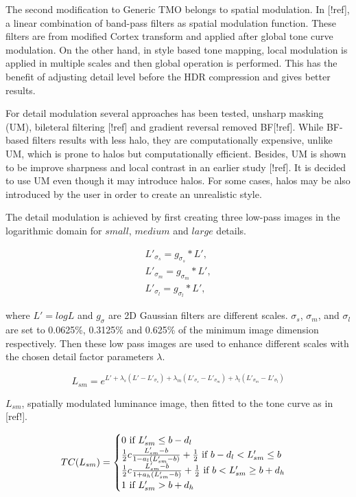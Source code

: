 The second modification to Generic TMO belongs to spatial modulation. In [!ref], a linear combination of band-pass filters as spatial modulation function. These filters are from modified Cortex transform and applied after global tone curve modulation. On the other hand, in style based tone mapping, local modulation is applied in multiple scales and then global operation is performed. This has the benefit of adjusting detail level before the HDR compression and gives better results. 

For detail modulation several approaches has been tested, unsharp masking (UM), bileteral filtering [!ref] and gradient reversal removed BF[!ref]. While BF-based filters results with less halo, they are computationally expensive, unlike UM, which is prone to halos but computationally efficient. Besides, UM is shown to be improve sharpness and local contrast in an earlier study [!ref]. It is decided to use UM even though it may introduce halos. For some cases, halos may be also introduced by the user in order to create an unrealistic style.

The detail modulation is achieved by first creating three low-pass images in the logarithmic domain for $small$, $medium$ and $large$ details.

\begin{align}
L'_{\sigma_s} = g _{\sigma_s} * L', \\
L'_{\sigma_m} = g _{\sigma_m} * L', \\
L'_{\sigma_l} = g _{\sigma_l} * L', 
\end{align}

where $L' = log L$ and $g_\sigma$ are 2D Gaussian filters are different scales. $\sigma_s$, $\sigma_m$, and $\sigma_l$ are set to 0.0625\%, 0.3125\% and 0.625\% of the minimum image dimension respectively. Then these low pass images are used to enhance different scales with the chosen detail factor parameters $\lambda$.

\begin{equation}
    L_{sm} = e^{L' + \lambda_s(L' - L'_{\sigma_s}) + \lambda_m(L'_{\sigma_s} - L'_{\sigma_m}) + \lambda_l(L'_{\sigma_m} - L'_{\sigma_l})}
\end{equation}

$L_{sm}$, spatially modulated luminance image, then fitted to the tone curve as in [ref!]. 

\begin{equation}
    TC(L_{sm}) = 
    \begin{cases}
    0 \text{  if  $L_{sm}' \leq b - d_l$ } \\
    \frac{1}{2}c {{L_{sm}' - b}\over{1 - a_l(L_{sm}'-b)}} + \frac{1}{2} \text{ if $b - d_l < L_{sm}' \leq b $ } \\ 
    \frac{1}{2}c {{L_{sm}' - b}\over{1 + a_h(L_{sm}'-b)}} + \frac{1}{2} \text{ if $b < L_{sm}' \geq b + d_h$} \\ 
    1 \text{ if  $L_{sm}' > b + d_h$}
    \end{cases}
\end{equation}

